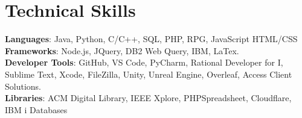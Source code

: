 \documentclass[letterpaper,11pt]{article}
\begin{document}
%
\section{Technical Skills}
 \begin{itemize}[leftmargin=0.15in, label={}]
    \small{\item{
     \textbf{Languages}{: Java, Python, C/C++, SQL, PHP, RPG, JavaScript HTML/CSS} \\
     \textbf{Frameworks}{: Node.js, JQuery, DB2 Web Query, IBM, LaTex.} \\
     \textbf{Developer Tools}{: GitHub, VS Code, PyCharm, Rational Developer for I, Sublime Text, Xcode, FileZilla, Unity, Unreal Engine, Overleaf, Access Client Solutions.} \\
     \textbf{Libraries}{: ACM Digital Library, IEEE Xplore, PHPSpreadsheet, Cloudflare, IBM i Databases}
    }}
 \end{itemize}


\end{document}
